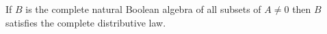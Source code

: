 If $B$ is the complete natural Boolean algebra of all subsets of $A \neq 0$ then $B$ satisfies the complete distributive law.
